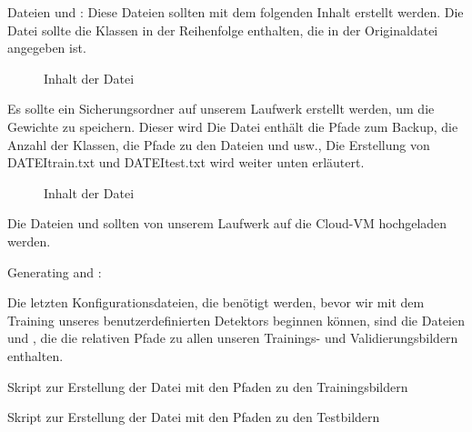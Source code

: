 Dateien  und :
Diese Dateien sollten mit dem folgenden Inhalt erstellt werden. 
Die Datei  sollte die Klassen in der Reihenfolge enthalten, die in der Originaldatei  angegeben ist.

\begin{figure}[H]
	\centering
	\caption{Inhalt der Datei }
\end{figure}

Es sollte ein Sicherungsordner auf unserem Laufwerk erstellt werden, um die Gewichte zu speichern. Dieser wird 
Die Datei  enthält die Pfade zum Backup, die Anzahl der Klassen, die Pfade zu den Dateien  und  usw., 
Die Erstellung von DATEI{train.txt} und DATEI{test.txt} wird weiter unten erläutert. 

\begin{figure}[H]
	\centering
	\caption{Inhalt der Datei }
\end{figure}

Die Dateien  und  sollten von unserem Laufwerk auf die Cloud-VM hochgeladen werden. 

\medskip



\medskip


Generating  and  : 

Die letzten Konfigurationsdateien, die benötigt werden, bevor wir mit dem Training unseres benutzerdefinierten Detektors beginnen können, sind die Dateien  und , die die relativen Pfade zu allen unseren Trainings- und Validierungsbildern enthalten.\cite{TheAIGuy:2021}

\begin{code}[H]
	{\tiny
	
    }
	\caption{Skript zur Erstellung der Datei  mit den Pfaden zu den Trainingsbildern}\label{TensorFlow:Complete}
\end{code}

\begin{code}[H]
	
	\caption{Skript zur Erstellung der Datei  mit den Pfaden zu den Testbildern}\label{TensorFlow:Complete}
\end{code}

